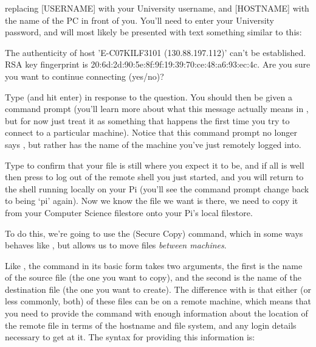 
replacing [USERNAME] with your University username, and [HOSTNAME] with the name of the PC in front of you. You'll need to enter your University password, and will most likely be presented with text something similar to this:

\begin{ttoutenv}
The authenticity of host 'E-C07KILF3101 (130.88.197.112)' can't be established.
RSA key fingerprint is 20:6d:2d:90:5e:8f:9f:19:39:70:ce:48:a6:93:ec:4c.
Are you sure you want to continue connecting (yes/no)? 
\end{ttoutenv}

Type  (and hit enter) in response to the question. You should then be given a command prompt (you'll learn more about what this message actually means in , but for now just treat it as something that happens the first time you try to connect to a particular machine). Notice that this command prompt no longer says , but rather has the name of the machine you've just remotely logged into. 

Type  to confirm that your  file is still where you expect it to be, and if all is well then press  to log out of the remote shell you just started, and you will return to the shell running locally on your Pi (you'll see the command prompt change back to being `pi' again). Now we know the file we want is there, we need to copy it from your Computer Science filestore onto your Pi's local filestore.

To do this, we're going to use the  (Secure Copy) command, which in some ways behaves like , but allows us to move files \textit{between machines}. 

Like , the  command in its basic form takes two arguments, the first is the name of the source file (the one you want to copy), and the second is the name of the destination file (the one you want to create). The difference with  is that either (or less commonly, both) of these files can be on a remote machine, which means that you need to provide the command with enough information about the location of the remote file in terms of the hostname and file system, and any login details necessary to get at it. The syntax for providing this information is:


